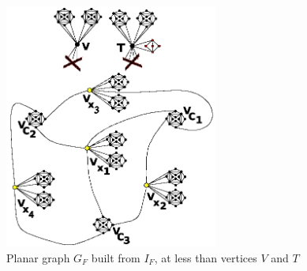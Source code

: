 \documentclass[
submission
]{dmtcs-episciences}
\begin{document}
%
\begin{figure}[H]	
\center%
\includegraphics[width=7cm]{2Apex}%
\caption{Planar graph $G_F$ built from $I_F$, at less than vertices $V$ and $T$ }
\label{fig:grafoIncidenciaCompleto}
\end{figure}



%

\label{sec:biblio}





\newpage






 
\end{document}

